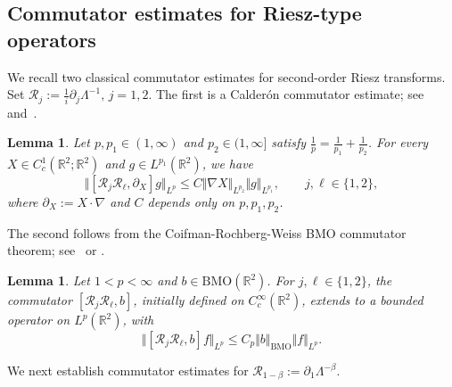 \documentclass[reqno,11pt,a4paper]{amsart}
\newtheorem{lemma}[theorem]{Lemma}
\newcommand{\R}{\ensuremath{\mathbb{R}}}
\begin{document}
\subsection{Commutator estimates for Riesz-type operators}\label{subsec:Riesz-commutators}

We recall two classical commutator estimates
for second-order Riesz transforms.
Set $\mathcal R_j:=\frac{1}{i}\partial_j\Lambda^{-1},\, j=1,2$. 
The first is a Calder\'on commutator estimate;
see~\cite{Calderon1965}
and~\cite[Lemma~2.2]{LZ24}.

\begin{lemma}\label{lem:riesz-comm}
Let $p,p_1\in(1,\infty)$ and $p_2\in(1,\infty]$
satisfy
$\frac1p=\frac1{p_1}+\frac1{p_2}$.
For every $X\in C_c^1(\R^2;\R^2)$
and $g\in L^{p_1}(\R^2)$, we have
\[
  \Vert [\mathcal R_j\mathcal R_\ell,\partial_X]g\Vert _{L^p}
  \leq
  C\Vert \nabla X\Vert _{L^{p_2}}\Vert g\Vert _{L^{p_1}},
  \qquad j,\ell\in\{1,2\},
\]
where $\partial_X:=X\cdot\nabla$
and $C$ depends only on $p,p_1,p_2$.
\end{lemma}

The second follows from the
Coifman-Rochberg-Weiss BMO commutator theorem;
see~\cite{CRW76} or \cite[Theorem 7.5.6]{Gra08}.

\begin{lemma}\label{lem:gra}
Let $1<p<\infty$ and $b\in\mathrm{BMO}(\R^2)$.
For $j,\ell\in\{1,2\}$,
the commutator $[\mathcal R_j\mathcal R_\ell,b]$,
initially defined on $C_c^\infty(\R^2)$,
extends to a bounded operator on $L^p(\R^2)$, with
\[
  \Vert [\mathcal R_j\mathcal R_\ell,b]f\Vert _{L^p}
  \leq
  C_p\Vert b\Vert _{\mathrm{BMO}}\Vert f\Vert _{L^p}.
\]
\end{lemma}

We next establish commutator estimates for
$\mathcal R_{1-\beta}:=\partial_1\Lambda^{-\beta}$.
\end{document}

